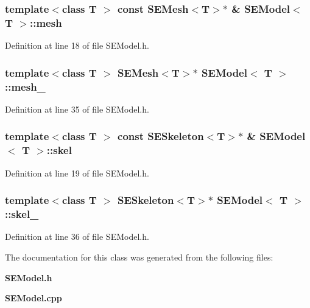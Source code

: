 \subsubsection[{mesh}]{\setlength{\rightskip}{0pt plus 5cm}template$<$class T $>$ const {\bf S\+E\+Mesh}$<$T$>$$\ast$ \& {\bf S\+E\+Model}$<$ T $>$\+::mesh}\label{class_s_e_model_a88cf5150b31b79bde5ffccbf7becce78}


Definition at line 18 of file S\+E\+Model.\+h.

\subsubsection[{mesh\+\_\+}]{\setlength{\rightskip}{0pt plus 5cm}template$<$class T $>$ {\bf S\+E\+Mesh}$<$T$>$$\ast$ {\bf S\+E\+Model}$<$ T $>$\+::mesh\+\_\+\hspace{0.3cm}{\ttfamily [protected]}}\label{class_s_e_model_a823fa4c7d6a066d6a79cd3bbedd3573a}


Definition at line 35 of file S\+E\+Model.\+h.

\subsubsection[{skel}]{\setlength{\rightskip}{0pt plus 5cm}template$<$class T $>$ const {\bf S\+E\+Skeleton}$<$T$>$$\ast$ \& {\bf S\+E\+Model}$<$ T $>$\+::skel}\label{class_s_e_model_a576214fa28af154208d94a05ce9b631d}


Definition at line 19 of file S\+E\+Model.\+h.

\subsubsection[{skel\+\_\+}]{\setlength{\rightskip}{0pt plus 5cm}template$<$class T $>$ {\bf S\+E\+Skeleton}$<$T$>$$\ast$ {\bf S\+E\+Model}$<$ T $>$\+::skel\+\_\+\hspace{0.3cm}{\ttfamily [protected]}}\label{class_s_e_model_aa046d796fb89ad7cdaa270b422709b15}


Definition at line 36 of file S\+E\+Model.\+h.



The documentation for this class was generated from the following files\+:\begin{DoxyCompactItemize}
\item 
{\bf S\+E\+Model.\+h}\item 
{\bf S\+E\+Model.\+cpp}\end{DoxyCompactItemize}
